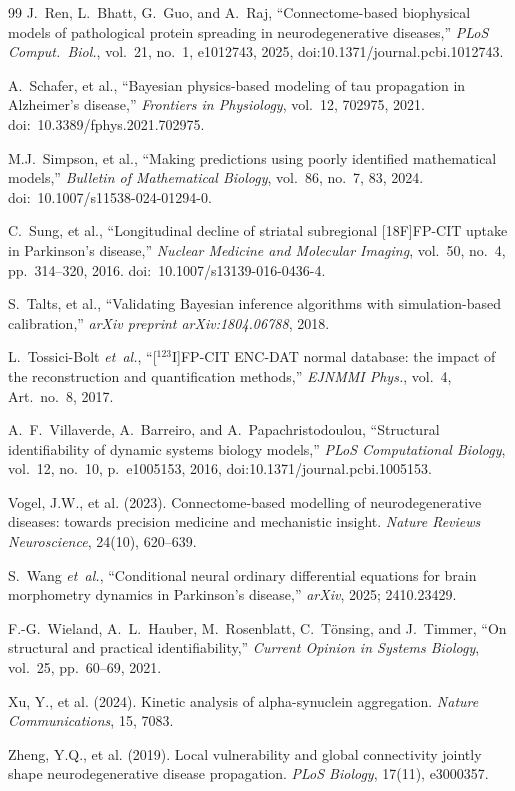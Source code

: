 \begin{thebibliography}{99}
J.~Ren, L.~Bhatt, G.~Guo, and A.~Raj, ``Connectome-based biophysical models of pathological protein spreading in neurodegenerative diseases,'' \textit{PLoS Comput.\ Biol.}, vol.~21, no.~1, e1012743, 2025, doi:10.1371/journal.pcbi.1012743.

A.~Schafer, et al., ``Bayesian physics-based modeling of tau propagation in Alzheimer's disease,'' \textit{Frontiers in Physiology}, vol.~12, 702975, 2021. doi:~10.3389/fphys.2021.702975.

M.J.~Simpson, et al., ``Making predictions using poorly identified mathematical models,'' \textit{Bulletin of Mathematical Biology}, vol.~86, no.~7, 83, 2024. doi:~10.1007/s11538-024-01294-0.

C.~Sung, et al., ``Longitudinal decline of striatal subregional [18F]FP-CIT uptake in Parkinson's disease,'' \textit{Nuclear Medicine and Molecular Imaging}, vol.~50, no.~4, pp.~314--320, 2016. doi:~10.1007/s13139-016-0436-4.

S.~Talts, et al., ``Validating Bayesian inference algorithms with simulation-based calibration,'' \textit{arXiv preprint arXiv:1804.06788}, 2018.


L.~Tossici-Bolt \textit{et~al.}, ``[$^{123}$I]FP-CIT ENC-DAT normal database: the impact of the reconstruction and quantification methods,'' \textit{EJNMMI Phys.}, vol.~4, Art.\ no.~8, 2017.

A.~F.~Villaverde, A.~Barreiro, and A.~Papachristodoulou, ``Structural identifiability of dynamic systems biology models,'' \textit{PLoS Computational Biology}, vol.~12, no.~10, p.~e1005153, 2016, doi:10.1371/journal.pcbi.1005153.

Vogel, J.W., et al. (2023).
\newblock Connectome-based modelling of neurodegenerative diseases: towards precision medicine and mechanistic insight.
\newblock \emph{Nature Reviews Neuroscience}, 24(10), 620--639.

S.~Wang \textit{et~al.}, ``Conditional neural ordinary differential equations for brain morphometry dynamics in Parkinson's disease,'' \textit{arXiv}, 2025; 2410.23429.

F.-G.~Wieland, A.~L.~Hauber, M.~Rosenblatt, C.~T\"onsing, and J.~Timmer, ``On structural and practical identifiability,'' \textit{Current Opinion in Systems Biology}, vol.~25, pp.~60--69, 2021.

Xu, Y., et al. (2024).
\newblock Kinetic analysis of alpha-synuclein aggregation.
\newblock \emph{Nature Communications}, 15, 7083.

Zheng, Y.Q., et al. (2019).
\newblock Local vulnerability and global connectivity jointly shape neurodegenerative disease propagation.
\newblock \emph{PLoS Biology}, 17(11), e3000357.

\end{thebibliography}
